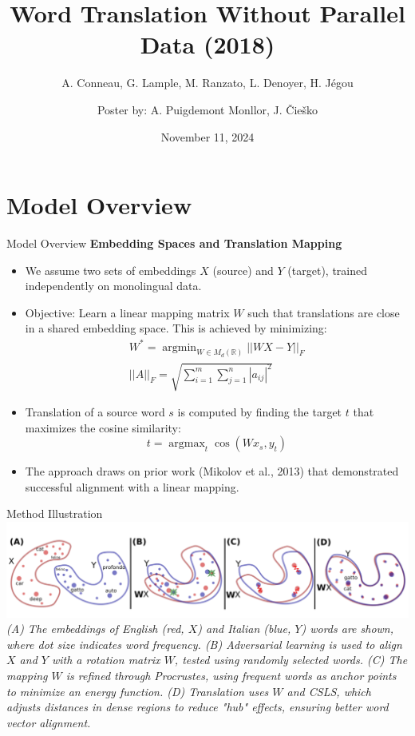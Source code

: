 \documentclass[]{beamer}
\title[Word Translation Without Parallel Data]{Word Translation Without Parallel Data (2018)}
\subtitle[]{A. Conneau, G. Lample, M. Ranzato, L. Denoyer, H. Jégou}
\author[ ]{Poster by: A. Puigdemont Monllor, J. Čieško\texorpdfstring{\\}{, }}
\institute[FI MU]{Faculty of Informatics, Masaryk University}
\date{November 11, 2024}
\DeclareMathOperator*{\argmax}{argmax}
\DeclareMathOperator*{\argmin}{argmin}
\begin{document}
\begin{frame}[plain]
\maketitle
\end{frame}

\section[]{Model Overview}
\begin{frame}{Model Overview}
    \small
    \textbf{Embedding Spaces and Translation Mapping}
    \begin{itemize}
        \item We assume two sets of embeddings $X$ (source) and $Y$ (target), trained independently on monolingual data.
        \item Objective: Learn a linear mapping matrix $W$ such that translations are close in a shared embedding space. This is achieved by minimizing:
        \begin{equation}
\begin{split}
            W^* = \argmin_{W \in M_d(\mathbb{R})} || W X - Y ||_F \\
	|| A ||_F = \sqrt{\sum_{i=1}^m \sum_{j=1}^n |a_{ij}|^2}	
	\end{split}
        \end{equation}
        \item Translation of a source word $s$ is computed by finding the target $t$ that maximizes the cosine similarity:
        \begin{equation}
            t = \argmax_{t} \cos(W x_s, y_t)
        \end{equation}
    \item The approach draws on prior work (Mikolov et al., 2013) that demonstrated successful alignment with a linear mapping.
    
	\end{itemize}
\end{frame}
\begin{frame}{Method Illustration}
    \includegraphics[width=1.0\linewidth]{figures/figure1.png}
\small
\textit{(A) The embeddings of English (red, $X$) and Italian (blue, $Y$) words are shown, where dot size indicates word frequency. (B) Adversarial learning is used to align $X$ and $Y$ with a rotation matrix $W$, tested using randomly selected words. (C) The mapping $W$ is refined through Procrustes, using frequent words as anchor points to minimize an energy function. (D) Translation uses $W$ and CSLS, which adjusts distances in dense regions to reduce "hub" effects, ensuring better word vector alignment.}
\end{frame}
\end{document}
